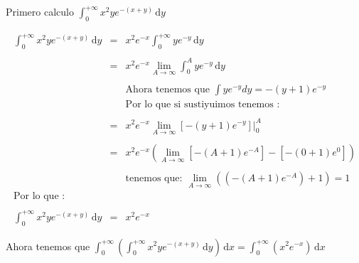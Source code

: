 \documentclass[12pt]{article}
\begin{document}
    \begin{flushleft}
        Primero calculo $\int_{0}^{+ \infty} x^2ye^{-\left(x+y\right)} \,\mathrm{d}y $ 
    \end{flushleft}

    \begin{equation*}
        \begin{array}{rcl}
            \displaystyle \int_{0}^{+ \infty} x^2ye^{-\left(x+y\right)} \,\mathrm{d}y  &= & \displaystyle  x^2 e^{-x} \int_{0}^{+\infty}  y e^ {-y}\,\mathrm{d}y
            \\
            \\
            & = &\displaystyle x^2 e^{-x}  \lim_{A \to \infty}  \int_{0}^{A} ye^{-y} \,\mathrm{d}y
            \\
            \\
            && \mbox{Ahora tenemos que $\displaystyle \int ye^{-y} dy = - \left(y+1\right) e^{-y}$}
            \\
            && \mbox{Por lo que si sustiyuimos tenemos : }
            \\
            \\
            & = & \displaystyle x^2 e^{-x}  \lim_{A \to \infty}  \left[- \left(y+1\right) e^{-y}\right] \vert _{0}^{A}
            \\
            \\
            & = & \displaystyle x^2 e^{-x} \left( \lim_{A \to \infty} \left[- \left(A+1\right) e^{-A}\right] - \left[- \left(0+1\right) e^{0}\right]\right)  
            \\
            \\
            && \mbox{tenemos que: $\lim_{A \to \infty}\left( \left(- \left(A+1\right) e^{-A}\right) + 1 \right)  = 1 $}
            \\
            \mbox{Por lo que : }&&
            \\
            \\
            \displaystyle \int_{0}^{+ \infty} x^2ye^{-\left(x+y\right)} \,\mathrm{d}y & = & \displaystyle x^2e^{-x}
        \end{array}
    \end{equation*}

    \begin{flushleft}
        Ahora tenemos que  $\displaystyle \int_{0}^{+\infty} \left(\int_{0}^{+\infty} x^2ye^{-\left(x+y\right)} \,\mathrm{d}y \right) \,\mathrm{d}x  = \displaystyle \int_{0}^{+\infty} \left(x^2e^{-x} \right) \,\mathrm{d}x  $  
    \end{flushleft}
\end{document}
